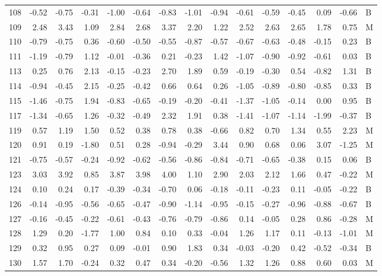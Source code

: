 \begin{table}[ht]
\begin{tabular}{rrrrrrrrrrrrrrl}
  108 & -0.52 & -0.75 & -0.31 & -1.00 & -0.64 & -0.83 & -1.01 & -0.94 & -0.61 & -0.59 & -0.45 & 0.09 & -0.66 & B \\ 
  109 & 2.48 & 3.43 & 1.09 & 2.84 & 2.68 & 3.37 & 2.20 & 1.22 & 2.52 & 2.63 & 2.65 & 1.78 & 0.75 & M \\ 
  110 & -0.79 & -0.75 & 0.36 & -0.60 & -0.50 & -0.55 & -0.87 & -0.57 & -0.67 & -0.63 & -0.48 & -0.15 & 0.23 & B \\ 
  111 & -1.19 & -0.79 & 1.12 & -0.01 & -0.36 & 0.21 & -0.23 & 1.42 & -1.07 & -0.90 & -0.92 & -0.61 & 0.03 & B \\ 
  113 & 0.25 & 0.76 & 2.13 & -0.15 & -0.23 & 2.70 & 1.89 & 0.59 & -0.19 & -0.30 & 0.54 & -0.82 & 1.31 & B \\ 
  114 & -0.94 & -0.45 & 2.15 & -0.25 & -0.42 & 0.66 & 0.64 & 0.26 & -1.05 & -0.89 & -0.80 & -0.85 & 0.33 & B \\ 
  115 & -1.46 & -0.75 & 1.94 & -0.83 & -0.65 & -0.19 & -0.20 & -0.41 & -1.37 & -1.05 & -0.14 & 0.00 & 0.95 & B \\ 
  117 & -1.34 & -0.65 & 1.26 & -0.32 & -0.49 & 2.32 & 1.91 & 0.38 & -1.41 & -1.07 & -1.14 & -1.99 & -0.37 & B \\ 
  119 & 0.57 & 1.19 & 1.50 & 0.52 & 0.38 & 0.78 & 0.38 & -0.66 & 0.82 & 0.70 & 1.34 & 0.55 & 2.23 & M \\ 
  120 & 0.91 & 0.19 & -1.80 & 0.51 & 0.28 & -0.94 & -0.29 & 3.44 & 0.90 & 0.68 & 0.06 & 3.07 & -1.25 & M \\ 
  121 & -0.75 & -0.57 & -0.24 & -0.92 & -0.62 & -0.56 & -0.86 & -0.84 & -0.71 & -0.65 & -0.38 & 0.15 & 0.06 & B \\ 
  123 & 3.03 & 3.92 & 0.85 & 3.87 & 3.98 & 4.00 & 1.10 & 2.90 & 2.03 & 2.12 & 1.66 & 0.47 & -0.22 & M \\ 
  124 & 0.10 & 0.24 & 0.17 & -0.39 & -0.34 & -0.70 & 0.06 & -0.18 & -0.11 & -0.23 & 0.11 & -0.05 & -0.22 & B \\ 
  126 & -0.14 & -0.95 & -0.56 & -0.65 & -0.47 & -0.90 & -1.14 & -0.95 & -0.15 & -0.27 & -0.96 & -0.88 & -0.67 & B \\ 
  127 & -0.16 & -0.45 & -0.22 & -0.61 & -0.43 & -0.76 & -0.79 & -0.86 & 0.14 & -0.05 & 0.28 & 0.86 & -0.28 & M \\ 
  128 & 1.29 & 0.20 & -1.77 & 1.00 & 0.84 & 0.10 & 0.33 & -0.04 & 1.26 & 1.17 & 0.11 & -0.13 & -1.01 & M \\ 
  129 & 0.32 & 0.95 & 0.27 & 0.09 & -0.01 & 0.90 & 1.83 & 0.34 & -0.03 & -0.20 & 0.42 & -0.52 & -0.34 & B \\ 
  130 & 1.57 & 1.70 & -0.24 & 0.32 & 0.47 & 0.34 & -0.20 & -0.56 & 1.32 & 1.26 & 0.88 & 0.60 & 0.03 & M \\ 

\end{tabular}
\end{table}
